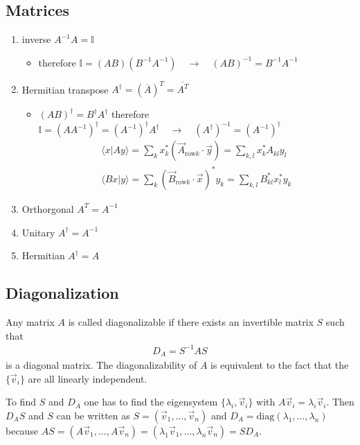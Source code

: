 \documentclass[10pt,a4paper]{book}
\theoremstyle{definition}
\begin{document}
\subsection{Matrices}
\begin{enumerate}
    \item inverse $A^{-1}A=\mathbb{I}$
    \begin{itemize}
        \item therefore $\mathbb{I}=(AB)(B^{-1}A^{-1})\quad\rightarrow\quad (AB)^{-1}=B^{-1}A^{-1}$
    \end{itemize}
    \item Hermitian transpose $A^\dagger = (\overline{A})^T = \overline{A^T}$
        \begin{itemize}
        \item $(AB)^\dagger=B^\dagger A^\dagger$ therefore $\mathbb{I}=(AA^{-1})^\dagger=(A^{-1})^\dagger A^\dagger\quad\rightarrow\quad (A^\dagger)^{-1}=(A^{-1})^\dagger$
        \begin{align}
        \langle x |A y\rangle=\sum_k x_k^* (\vec{A}_{\text{row}k}\cdot\vec{y})=\sum_{k,l} x_k^* A_{kl}y_l\\
        \langle Bx |y\rangle = \sum_k(\vec{B}_{\text{row}k}\cdot \vec{x})^*y_k= \sum_{k,l}B_{kl}^*x_l^*y_k
        \end{align}
    \end{itemize}
    \item Orthorgonal $A^T = A^{-1}$
    \item Unitary $A^\dagger = A^{-1}$
    \item Hermitian $A^\dagger = A$
\end{enumerate}

\subsection{Diagonalization}
Any  matrix $A$ is called diagonalizable if there exists an invertible matrix $S$ such that
\begin{align}
    D_A=S^{-1}AS
\end{align}
is a diagonal matrix. The diagonalizability of $A$ is equivalent to the fact that the $\{\vec{v}_i\}$ are all linearly independent.

To find $S$ and $D_A$ one has to find the eigensystem $\{\lambda_i,\vec{v}_i\}$ with $A\vec{v}_i=\lambda_i\vec{v}_i$. Then $D_AS$ and $S$ can be written as $S=(\vec{v}_1,...,\vec{v}_n)$ and $D_A=\text{diag}(\lambda_1,...,\lambda_n)$ because $AS=(A\vec{v}_1,...,A\vec{v}_n)=(\lambda_1\vec{v}_1,...,\lambda_n\vec{v}_n)=SD_A$.
\end{document}

